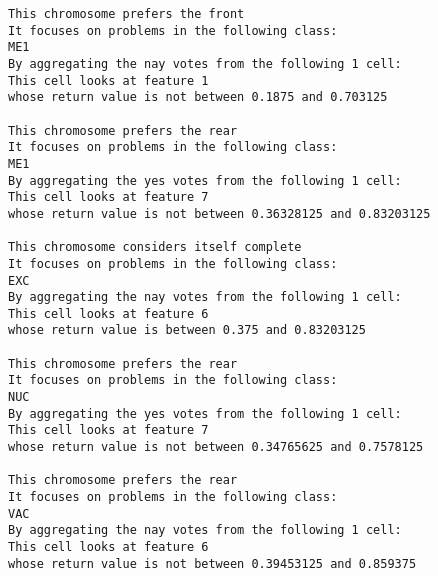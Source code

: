 \begin{lstlisting}[caption={Best Hunter, Yeast}]
This chromosome prefers the front
It focuses on problems in the following class:
ME1
By aggregating the nay votes from the following 1 cell:
This cell looks at feature 1
whose return value is not between 0.1875 and 0.703125 

This chromosome prefers the rear
It focuses on problems in the following class:
ME1
By aggregating the yes votes from the following 1 cell:
This cell looks at feature 7
whose return value is not between 0.36328125 and 0.83203125 

This chromosome considers itself complete
It focuses on problems in the following class:
EXC
By aggregating the nay votes from the following 1 cell:
This cell looks at feature 6
whose return value is between 0.375 and 0.83203125 

This chromosome prefers the rear
It focuses on problems in the following class:
NUC
By aggregating the yes votes from the following 1 cell:
This cell looks at feature 7
whose return value is not between 0.34765625 and 0.7578125 

This chromosome prefers the rear
It focuses on problems in the following class:
VAC
By aggregating the nay votes from the following 1 cell:
This cell looks at feature 6
whose return value is not between 0.39453125 and 0.859375 

\end{lstlisting}